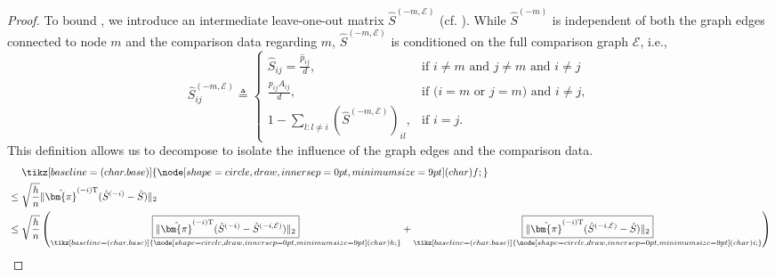 \documentclass[sigconf,nonacm,pbalance]{acmart}
\newcommand{\tran}{{\mathrm{T}}}
\newcommand{\circled}[1]{
    \tikz[baseline=(char.base)]{\node[shape=circle, draw, inner sep=0pt,minimum size=9pt] (char) {#1};}
}
\begin{document}
\begin{proof}
To bound \circled{f}, we introduce an intermediate leave-one-out matrix $\hat{S}^{(-m,\mathcal{E})}$ (cf. \cite[Lemma 5.6]{Chenetal2019}). While $\hat{S}^{(-m)}$ is independent of both the graph edges connected to node $m$ and the comparison data regarding $m$, $\hat{S}^{(-m,\mathcal{E})}$ is conditioned on the full comparison graph $\mathcal{E}$, i.e.,
\begin{equation}
    \hat{S}^{(-m,\mathcal{E})}_{ij} \triangleq \begin{cases}
        \hat{S}_{ij}=\frac{\hat{p}_{ij}}{d}, & \text{if } i \neq m \text{ and } j \neq m \text{ and } i\neq j \\
        \frac{p_{ij} A_{ij}}{d}, & \text{if (} i=m \text{ or } j=m \text{) and } i \neq j,\\
        1-\sum_{l:l\neq i} (\hat{S}^{(-m,\mathcal{E})})_{il}, & \text{if } i=j.
    \end{cases}
\end{equation}
This definition allows us to decompose \circled{f} to isolate the influence of the graph edges and the comparison data.
\begin{align}
    &\phantom{{}={}}\circled{f} \\
    &\leq \sqrt{\frac{h}{n}} \|\hat{\bm{\pi}}^{(-i)\tran} (\hat{S}^{(-i)}-\hat{S})\|_2 \\
    &\leq \sqrt{\frac{h}{n}}\left(\underset{\circled{h}}{\boxed{\|\hat{\bm{\pi}}^{(-i)\tran} (\hat{S}^{(-i)}-\hat{S}^{(-i,\mathcal{E})})\|_2}}+\underset{\circled{i}}{\boxed{\|\hat{\bm{\pi}}^{(-i)\tran} (\hat{S}^{(-i,\mathcal{E})}-\hat{S})\|_2}}\right)
\end{align}


\end{proof}
\end{document}
